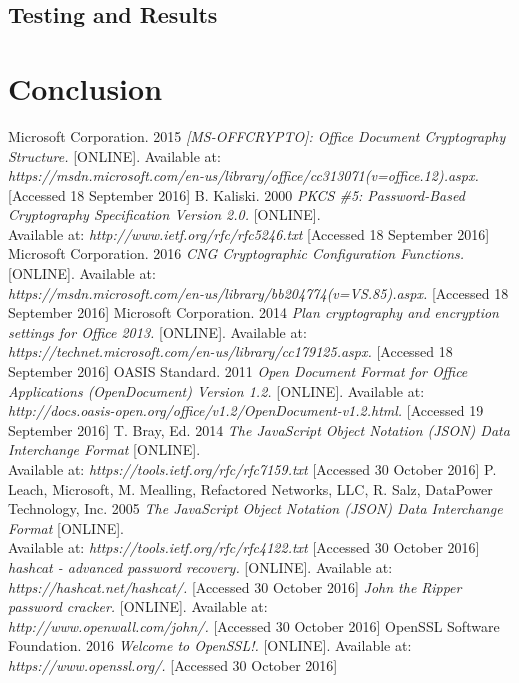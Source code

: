 \documentclass[11pt,oneside]{fithesis2}
\begin{document}
\section{Testing and Results}

\chapter{Conclusion}

\begin{thebibliography}{}
	Microsoft Corporation. 2015 \textit{[MS-OFFCRYPTO]: Office Document Cryptography Structure.} [ONLINE].
Available at: \\ \textit{https://msdn.microsoft.com/en-us/library/office/cc313071(v=office.12).aspx.} [Accessed 18 September 2016]
	 B. Kaliski. 2000 \textit{PKCS \#5: Password-Based Cryptography Specification Version 2.0.} [ONLINE].\\ Available at: \textit{http://www.ietf.org/rfc/rfc5246.txt} [Accessed 18 September 2016]
	Microsoft Corporation. 2016 \textit{CNG Cryptographic Configuration Functions.} [ONLINE].
Available at: \\ \textit{https://msdn.microsoft.com/en-us/library/bb204774(v=VS.85).aspx.} [Accessed 18 September 2016]
	Microsoft Corporation. 2014 \textit{Plan cryptography and encryption settings for Office 2013.} [ONLINE].
Available at: \\ \textit{https://technet.microsoft.com/en-us/library/cc179125.aspx.} [Accessed 18 September 2016]
	OASIS Standard. 2011 \textit{Open Document Format for Office Applications (OpenDocument) Version 1.2.} [ONLINE]. Available at: \textit{http://docs.oasis-open.org/office/v1.2/OpenDocument-v1.2.html.} [Accessed 19 September 2016]
	 T. Bray, Ed. 2014 \textit{The JavaScript Object Notation (JSON) Data Interchange Format} [ONLINE].\\ Available at: 	\textit{https://tools.ietf.org/rfc/rfc7159.txt} [Accessed 30 October 2016]
	 P. Leach, Microsoft, M. Mealling, Refactored Networks, LLC, R. Salz, DataPower Technology, Inc.  2005 \textit{The JavaScript Object Notation (JSON) Data Interchange Format} [ONLINE].\\ Available at: \textit{https://tools.ietf.org/rfc/rfc4122.txt} [Accessed 30 October 2016]
	\textit{hashcat - advanced password recovery.} [ONLINE].
Available at: \\ \textit{https://hashcat.net/hashcat/.} [Accessed 30 October 2016]
	\textit{John the Ripper password cracker.} [ONLINE].
Available at: \\ \textit{http://www.openwall.com/john/.} [Accessed 30 October 2016]
	OpenSSL Software Foundation. 2016 \textit{Welcome to OpenSSL!.} [ONLINE].
Available at: \\ \textit{https://www.openssl.org/.} [Accessed 30 October 2016]
\end{thebibliography}
\end{document}

